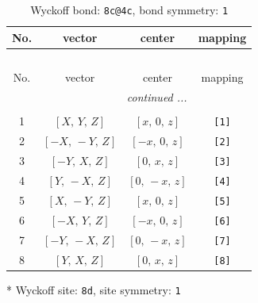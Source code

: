 \documentclass[fleqn,8pt]{jsarticle}
\begin{document}
\renewcommand{\arraystretch}{1.2}
\begin{longtable}{cccc}
\caption{Wyckoff bond: {\tt 8c@4c}, bond symmetry: {\tt 1}}
 \\
 \hline \hline
No. & vector & center & mapping \\ \hline \endfirsthead

\multicolumn{3}{l}{\tablename\ \thetable{}} \\
 \hline \hline
No. & vector & center & mapping \\ \hline \endhead

 \hline \hline
\multicolumn{3}{r}{\footnotesize\it continued ...} \\ \endfoot

 \hline \hline
\multicolumn{3}{r}{} \\ \endlastfoot

1 & $\left[ X,\, Y,\, Z \right]$ & $\left[ x,\, 0,\, z \right]$ & {\tt [1]} \\ \hline
2 & $\left[ - X,\, - Y,\, Z \right]$ & $\left[ - x,\, 0,\, z \right]$ & {\tt [2]} \\ \hline
3 & $\left[ - Y,\, X,\, Z \right]$ & $\left[ 0,\, x,\, z \right]$ & {\tt [3]} \\ \hline
4 & $\left[ Y,\, - X,\, Z \right]$ & $\left[ 0,\, - x,\, z \right]$ & {\tt [4]} \\ \hline
5 & $\left[ X,\, - Y,\, Z \right]$ & $\left[ x,\, 0,\, z \right]$ & {\tt [5]} \\ \hline
6 & $\left[ - X,\, Y,\, Z \right]$ & $\left[ - x,\, 0,\, z \right]$ & {\tt [6]} \\ \hline
7 & $\left[ - Y,\, - X,\, Z \right]$ & $\left[ 0,\, - x,\, z \right]$ & {\tt [7]} \\ \hline
8 & $\left[ Y,\, X,\, Z \right]$ & $\left[ 0,\, x,\, z \right]$ & {\tt [8]} \\
\end{longtable}
* Wyckoff site: {\tt 8d}, site symmetry: {\tt 1}
\renewcommand{\arraystretch}{1.2}
\end{document}
